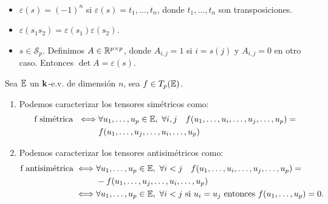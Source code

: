 \begin{obs}~
    \begin{itemize}
        \item $\varepsilon (s) = (-1)^n$ si $\varepsilon (s) = t_1, \dots , t_n$, donde 
        $t_1,\dots,t_n$ son transposiciones.
        \item $\varepsilon (s_1 s_2) = \varepsilon (s_1) \varepsilon(s_2)$.
        \item $s \in \mathcal{S}_p$. Definimos $A \in \mathbb{R} ^{p\times p}$, donde
        $A_{i,j} = 1$ si $i = s(j)$ y $A_{i,j} = 0$ en otro caso. Entonces
        $\det A = \varepsilon(s)$.       
    \end{itemize}
\end{obs}
\begin{prop}
    Sea $\mathbb{E}$ un $\mathbf{k}$-e.v. de dimensión $n$, sea $f \in T_p(\mathbb{E})$.
    \begin{enumerate}
        \item Podemos caracterizar los tensores simétricos como:
        \[
        \begin{split}\text{f simétrica } \iff &
        \forall u_1,\dots,u_p \in \mathbb{E}, \  \forall i,j \quad 
        f(u_1,\dots,u_i,\dots,u_j,\dots,u_p) = \\ 
        &f(u_1,\dots,u_j,\dots,u_i,\dots,u_p)
        \end{split}
        \]
        \item Podemos caracterizar los tensores antisimétricos como: 
        \[
        \begin{split}\text{f antisimétrica} \iff & 
        \forall u_1,\dots,u_p \in \mathbb{E}, \  \forall i < j \quad
        f(u_1,\dots,u_i,\dots,u_j,\dots,u_p) = \\ 
        &-f(u_1,\dots,u_j,\dots,u_i,\dots,u_p)\\
        \iff& \forall u_1,\dots,u_p \in \mathbb{E}, \ \forall i < j \text{ si } u_i=u_j 
        \text{ entonces } f(u_1,\dots,u_p) = 0.
        \end{split}\]
    \end{enumerate}
\end{prop}
